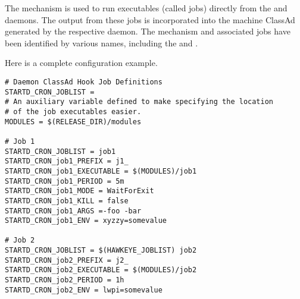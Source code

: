 The  mechanism is
used to run executables (called jobs) directly from the
 and  daemons. 
The output from these jobs is incorporated into the machine ClassAd
generated by the respective daemon.
The mechanism and associated jobs have been identified by various
names, including the  and .

\MoreTodo

Here is a complete configuration example.
\footnotesize
\begin{verbatim}
# Daemon ClassAd Hook Job Definitions
STARTD_CRON_JOBLIST =
# An auxiliary variable defined to make specifying the location
# of the job executables easier.
MODULES = $(RELEASE_DIR)/modules

# Job 1
STARTD_CRON_JOBLIST = job1
STARTD_CRON_job1_PREFIX = j1_
STARTD_CRON_job1_EXECUTABLE = $(MODULES)/job1
STARTD_CRON_job1_PERIOD = 5m
STARTD_CRON_job1_MODE = WaitForExit
STARTD_CRON_job1_KILL = false
STARTD_CRON_job1_ARGS =-foo -bar
STARTD_CRON_job1_ENV = xyzzy=somevalue

# Job 2
STARTD_CRON_JOBLIST = $(HAWKEYE_JOBLIST) job2
STARTD_CRON_job2_PREFIX = j2_
STARTD_CRON_job2_EXECUTABLE = $(MODULES)/job2
STARTD_CRON_job2_PERIOD = 1h
STARTD_CRON_job2_ENV = lwpi=somevalue

\end{verbatim}
\normalsize

